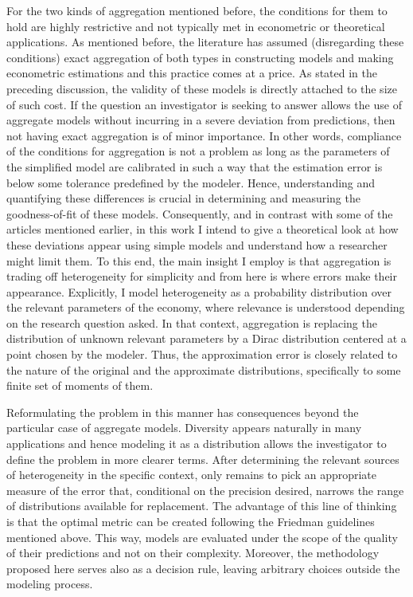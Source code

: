 \documentclass[english, a4paper, 12pt]{article}
\begin{document}
For the two kinds of aggregation mentioned before, the conditions for them to hold are highly restrictive and not typically met in econometric or theoretical applications. As mentioned before, the literature has assumed (disregarding these conditions) exact aggregation of both types in constructing models and making econometric estimations and this practice comes at a price. As stated in the preceding discussion, the validity of these models is directly attached to the size of such cost. If the question an investigator is seeking to answer allows the use of aggregate models without incurring in a severe deviation from predictions, then not having exact aggregation is of minor importance. In other words, compliance of the conditions for aggregation is not a problem as long as the parameters of the simplified model are calibrated in such a way that the estimation error is below some tolerance predefined by the modeler. Hence, understanding and quantifying these differences is crucial in determining and measuring the goodness-of-fit of these models. Consequently, and in contrast with some of the articles mentioned earlier, in this work I intend to give a theoretical look at how these deviations appear using simple models and understand how a researcher might limit them. To this end, the main insight I employ is that aggregation is trading off heterogeneity for simplicity and from here is where errors make their appearance. Explicitly, I model heterogeneity as a probability distribution over the relevant parameters of the economy, where relevance is understood depending on the research question asked. In that context, aggregation is replacing the distribution of unknown relevant parameters by a Dirac distribution centered at a point chosen by the modeler. Thus, the approximation error is closely related to the nature of the original and the approximate distributions, specifically to some finite set of moments of them.

Reformulating the problem in this manner has consequences beyond the particular case of aggregate models. Diversity appears naturally in many applications and hence modeling it as a distribution allows the investigator to define the problem in more clearer terms. After determining the relevant sources of heterogeneity in the specific context, only remains to pick an appropriate measure of the error that, conditional on the precision desired, narrows the range of distributions available for replacement. The advantage of this line of thinking is that the optimal metric can be created following the Friedman guidelines mentioned above. This way, models are evaluated under the scope of the quality of their predictions and not on their complexity. Moreover, the methodology proposed here serves also as a decision rule, leaving arbitrary choices outside the modeling process.
\end{document}
